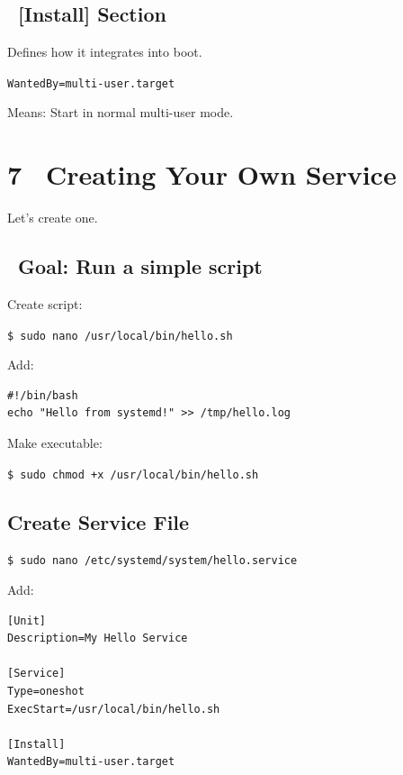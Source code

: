 \documentclass[12pt]{article}
\begin{document}
\subsection*{\faPlug\ [Install] Section}

Defines how it integrates into boot.

\begin{highlightbox}
\texttt{WantedBy=multi-user.target}
\end{highlightbox}

Means: Start in normal multi-user mode.

\section*{7 \faCode\ Creating Your Own Service}

Let's create one.

\subsection*{\faBullseye\ Goal: Run a simple script}

Create script:

\begin{highlightbox}
\texttt{\$ sudo nano /usr/local/bin/hello.sh}
\end{highlightbox}

Add:

\begin{highlightbox}
\begin{verbatim}
#!/bin/bash
echo "Hello from systemd!" >> /tmp/hello.log
\end{verbatim}
\end{highlightbox}

Make executable:

\begin{highlightbox}
\texttt{\$ sudo chmod +x /usr/local/bin/hello.sh}
\end{highlightbox}

\subsection*{Create Service File}

\begin{highlightbox}
\texttt{\$ sudo nano /etc/systemd/system/hello.service}
\end{highlightbox}

Add:

\begin{highlightbox}
\begin{verbatim}
[Unit]
Description=My Hello Service

[Service]
Type=oneshot
ExecStart=/usr/local/bin/hello.sh

[Install]
WantedBy=multi-user.target
\end{verbatim}
\end{highlightbox}
\end{document}
